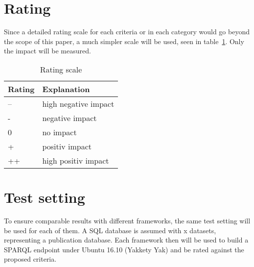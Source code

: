 \section{Rating}

Since a detailed rating scale for each criteria or in each category would go beyond the scope of this paper, a much simpler scale will be used, seen in table~\ref{tbl_rating}. Only the impact will be measured.

\begin{table}[htbp]
\centering
\begin{tabular}{|l|l|}
\hline
\textbf{Rating} & \textbf{Explanation} \\ \hline
--              & high negative impact \\ \hline
-               & negative impact      \\ \hline
0               & no impact            \\ \hline
+               & positiv impact       \\ \hline
++              & high positiv impact  \\ \hline
\end{tabular}
\caption{Rating scale}
\label{tbl_rating}
\end{table}

\section{Test setting}
To ensure comparable results with different frameworks, the same test setting will be used for each of them. A SQL database is assumed with x  datasets, representing a publication database. Each framework then will be used to build a SPARQL endpoint under Ubuntu 16.10 (Yakkety Yak) and be rated against the proposed criteria.